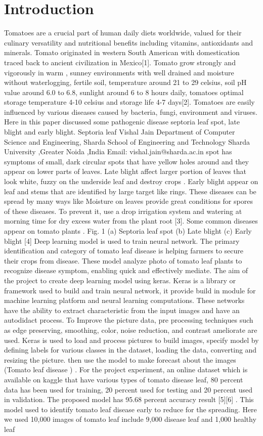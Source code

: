\documentclass[conference]{IEEEtran}
\begin{document}
\section{Introduction}
Tomatoes are a crucial part of human daily diets worldwide, valued for their culinary versatility and nutritional benefits including vitamins, antioxidants and minerals. Tomato originated in western South American with domestication traced back to ancient civilization in Mexico[1]. Tomato grow strongly and vigorously in warm , sunney environments with well drained and moisture without waterlogging, fertile soil, temperature around 21 to 29 celsius, soil pH value around 6.0 to 6.8, sunlight around 6 to 8 hours daily, tomatoes optimal storage temperature 4-10 celsius and storage life 4-7 days[2]. Tomatoes are easily influenced by various diseases caused by bacteria, fungi, environment and viruses. Here in this paper discussed some pathogenic disease septoria leaf spot, late blight and early blight. Septoria leaf Vishal Jain Department of Computer Science and Engineering, Sharda School of Engineering and Technology Sharda University ,Greater Noida ,India Email: vishal.jain@sharda.ac.in spot has symptoms of small, dark circular spots that have yellow holes around and they appear on lower parts of leaves. Late blight affect larger portion of leaves that look white, fuzzy on the underside leaf and destroy crops . Early blight appear on leaf and stems that are identified by large target like rings. These diseases can be spread by many ways like Moisture on leaves provide great conditions for spores of these diseases. To prevent it, use a drop irrigation system and watering at morning time for dry excess water from the plant root [3]. Some common diseases appear on tomato plants . Fig. 1 (a) Septoria leaf spot (b) Late blight (c) Early blight [4] Deep learning model is used to train neural network. The primary identification and category of tomato leaf disease is helping farmers to secure their crops from disease. These model analyze photo of tomato leaf plants to recognize disease symptom, enabling quick and effectively mediate. The aim of the project to create deep learning model using keras. Keras is a library or framework used to build and train neural network, it provide build in module for machine learning platform and neural learning computations. These networks have the ability to extract characteristic from the input images and have an autodidact process. To Improve the picture data, pre processing techniques such as edge preserving, smoothing, color, noise reduction, and contrast ameliorate are used. Keras is used to load and process pictures to build images, specify model by defining labels for various classes in the dataset, loading the data, converting and resizing the picture. then use the model to make forecast about the images (Tomato leaf disease ) . For the project experiment, an online dataset which is available on kaggle that have various types of tomato disease leaf, 80 percent data has been used for training, 20 percent used for testing and 20 percent used in validation. The proposed model has 95.68 percent accuracy result [5][6] . This model used to identify tomato leaf disease early to reduce for the spreading. Here we used 10,000 images of tomato leaf include 9,000 disease leaf and 1,000 healthy leaf
\end{document}
